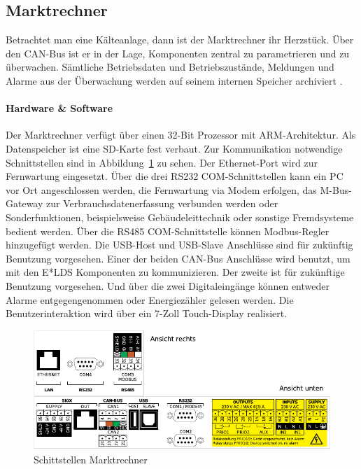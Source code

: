 \documentclass[11pt,a4paper]{report}
\begin{document}
\subsection{Marktrechner} \label{sec:marktrechner} 
Betrachtet man eine Kälteanlage, dann ist der Marktrechner ihr Herzstück. Über den CAN-Bus ist er in der Lage, Komponenten zentral zu parametrieren und zu überwachen. Sämtliche Betriebsdaten und Betriebszustände, Meldungen und Alarme aus der Überwachung werden auf seinem internen Speicher archiviert \cite{elds}.

\paragraph{Hardware \& Software} Der Marktrechner verfügt über einen 32-Bit Prozessor mit ARM-Architektur. Als Datenspeicher ist eine SD-Karte fest verbaut. Zur Kommunikation notwendige Schnittstellen sind in Abbildung~\ref{fig:marktrechner_interfaces} zu sehen. Der Ethernet-Port wird zur Fernwartung eingesetzt. Über die drei RS232 COM-Schnittstellen kann ein PC vor Ort angeschlossen werden, die Fernwartung via Modem erfolgen, das M-Bus-Gateway zur Verbrauchsdatenerfassung verbunden werden oder Sonderfunktionen, beispielsweise Gebäudeleittechnik oder sonstige Fremdsysteme bedient werden. Über die RS485 COM-Schnittstelle können Modbus-Regler hinzugefügt werden. Die USB-Host und USB-Slave Anschlüsse sind für zukünftig Benutzung vorgesehen. Einer der beiden CAN-Bus Anschlüsse wird benutzt, um mit den E*LDS Komponenten zu kommunizieren. Der zweite ist für zukünftige Benutzung vorgesehen. Und über die zwei Digitaleingänge können entweder Alarme entgegengenommen oder Energiezähler gelesen werden. Die Benutzerinteraktion wird über ein 7-Zoll Touch-Display realisiert.

\begin{figure}[htbp]
\centering
\includegraphics[scale=1.1]{images/CI4000_Hardware_Sticker.pdf}
\caption{Schittstellen Marktrechner}
\label{fig:marktrechner_interfaces}
\end{figure}
\end{document}
